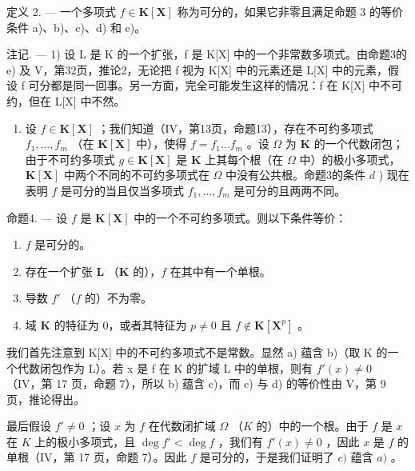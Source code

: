 定义 2. --- 一个多项式 \(f \in \mathbf{K}[\mathbf{X}]\) 称为可分的，如果它非零且满足命题 3 的等价条件 a)、b)、c)、d) 和 e)。

注记. --- 1) 设 L 是 K 的一个扩张，f 是 K{[}X{]} 中的一个非常数多项式。由命题3的 e) 及 V，第32页，推论2，无论把 f 视为 K{[}X{]} 中的元素还是 L{[}X{]} 中的元素，假设 f 可分都是同一回事。另一方面，完全可能发生这样的情况：f 在 K{[}X{]} 中不可约，但在 L{[}X{]} 中不然。

\begin{enumerate}
\def\labelenumi{\arabic{enumi})}
\setcounter{enumi}{1}
\tightlist
\item
  设 \(f \in \mathbf{K}[\mathbf{X}]\) ；我们知道（IV，第13页，命题13），存在不可约多项式 \(f_1, \ldots, f_m\) （在 \(\mathbf{K}[\mathbf{X}]\) 中），使得 \(f = f_1 \ldots f_m\) 。设 \(\Omega\) 为 \(\mathbf{K}\) 的一个代数闭包；由于不可约多项式 \(g \in \mathbf{K}[\mathbf{X}]\) 是 \(\mathbf{K}\) 上其每个根（在 \(\Omega\) 中）的极小多项式，\(\mathbf{K}[\mathbf{X}]\) 中两个不同的不可约多项式在 \(\Omega\) 中没有公共根。命题3的条件 \(d\) ) 现在表明 \(f\) 是可分的当且仅当多项式 \(f_1, \ldots, f_m\) 是可分的且两两不同。
\end{enumerate}

命题4. --- 设 \(f\) 是 \(\mathbf{K}[\mathbf{X}]\) 中的一个不可约多项式。则以下条件等价：

\begin{enumerate}
\def\labelenumi{\alph{enumi})}
\item
  \(f\) 是可分的。
\item
  存在一个扩张 \(\mathbf{L}\) （\(\mathbf{K}\) 的），\(f\) 在其中有一个单根。
\item
  导数 \(f'\) （\(f\) 的）不为零。
\item
  域 \(\mathbf{K}\) 的特征为 0，或者其特征为 \(p \neq 0\) 且 \(f \notin \mathbf{K}[\mathbf{X}^p]\) 。
\end{enumerate}

我们首先注意到 K{[}X{]} 中的不可约多项式不是常数。显然 a) 蕴含 b)（取 K 的一个代数闭包作为 L）。若 x 是 f 在 K 的扩域 L 中的单根，则有 \(f'(x) \neq 0\) （IV，第 17 页，命题 7），所以 b) 蕴含 c)，而 c) 与 d) 的等价性由 V，第 9 页，推论得出。

最后假设 \(f' \neq 0\) ；设 \(x\) 为 \(f\) 在代数闭扩域 \(\Omega\) （\(K\) 的）中的一个根。由于 \(f\) 是 \(x\) 在 \(K\) 上的极小多项式，且 \(\deg f' < \deg f\) ，我们有 \(f'(x) \neq 0\) ，因此 \(x\) 是 \(f\) 的单根（IV，第 17 页，命题 7）。因此 \(f\) 是可分的，于是我们证明了 \(c)\) 蕴含 \(a)\) 。

